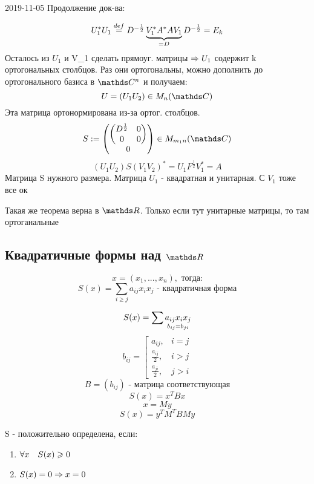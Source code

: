 \documentclass[main]{subfiles}
\begin{document}
  \begin{lect}{2019-11-05}
    Продолжение док-ва:
    \begin{Proof}
      \[U_1^* U_1 \os{def}{=} D^{-\frac{1}{2}} \ub{=D}{V_1^* A^* A V_1} D^{-\frac{1}{2}} = E_k\]
      Осталось из $U_1$ и V_1 сделать прямоуг. матрицы $\Ra U_1$ содержит k ортогональных столбцов. Раз они ортогональны, можно дополнить до ортогонального базиса в $\CC^n$ и получаем:
      \[U=(U_1 U_2) \in M_n(\CC)\]
      Эта матрица ортонормирована из-за ортог. столбцов.
      \[S:=\begin{pmatrix}
      \begin{pmatrix}
        D^{\frac{1}{2}} & 0\\
        0 & 0
      \end{pmatrix}\\
      0
      \end{pmatrix} \in M_{m_1 n}(\CC)\]
      \[(U_1 U_2) S (V_1 V_2)^* = U_1 F^{\frac{1}{2}} V_1^* = A\]
      Матрица S нужного размера. Матрица $U_1$ - квадратная и унитарная. С $V_1$ тоже все ок
    \end{Proof}

    \begin{remark}
      Такая же теорема верна в $\R$. Только если тут унитарные матрицы, то там ортоганальные
    \end{remark}

    \subsection{Квадратичные формы над $\R$}
    \begin{Definition}
      \[x=(x_1,...,x_n),\text{ тогда:}\]
      \[S(x) = \sum_{i \geq j} a_{ij} x_i x_j \text{ - квадратичная форма}\]
    \end{Definition}

    \begin{Remark}
      \[S(x) = \sum \us{b_{ij} = b_{ji}}{a_{ij} x_i x_j}\]
      \[b_{ij} = \left[\begin{matrix}
        a_{ij}, & i=j\\
        \frac{a_{ij}}{2}, & i > j\\
        \frac{a_{ji}}{2}, & j>i
      \end{matrix}\right.\]
      \[B=(b_{ij}) \text{ - матрица соответствующая}\]
      \[S(x) = x^T B x\]
      \[x = My\]
      \[S(x) = y^T M^T B My\]
    \end{Remark}

    \begin{definition}
      S - положительно определена, если:
      \begin{enumerate}
        \item $\forall x \q S(x) \geq 0$
        \item $S(x) = 0 \Ra x = 0$
      \end{enumerate}
    \end{definition}


\end{lect}
\end{document}
